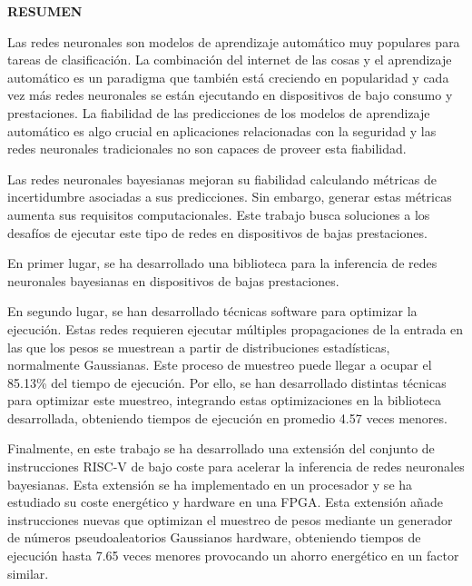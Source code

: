 \begin{center}

\vspace{1cm}
{\Large \bfseries RESUMEN}

\vspace{2cm}
\end{center}

Las redes neuronales son modelos de aprendizaje automático muy populares para tareas de clasificación. La combinación del internet de las cosas y el aprendizaje automático es un paradigma que también está creciendo en popularidad y cada vez más redes neuronales se están ejecutando en dispositivos de bajo consumo y prestaciones. La fiabilidad de las predicciones de los modelos de aprendizaje automático es algo crucial en aplicaciones relacionadas con la seguridad y las redes neuronales tradicionales no son capaces de proveer esta fiabilidad.

Las redes neuronales bayesianas mejoran su fiabilidad calculando métricas de incertidumbre asociadas a sus predicciones. Sin embargo, generar estas métricas aumenta sus requisitos computacionales. Este trabajo busca soluciones a los desafíos de ejecutar este tipo de redes en dispositivos de bajas prestaciones.

En primer lugar, se ha desarrollado una biblioteca para la inferencia de redes neuronales bayesianas en dispositivos de bajas prestaciones.

En segundo lugar, se han desarrollado técnicas software para optimizar la ejecución. Estas redes requieren ejecutar múltiples propagaciones de la entrada en las que los pesos se muestrean a partir de distribuciones estadísticas, normalmente Gaussianas. Este proceso de muestreo puede llegar a ocupar el 85.13\% del tiempo de ejecución. Por ello, se han desarrollado distintas técnicas para optimizar este muestreo, integrando estas optimizaciones en la biblioteca desarrollada, obteniendo tiempos de ejecución en promedio 4.57 veces menores.

Finalmente, en este trabajo se ha desarrollado una extensión del conjunto de instrucciones RISC-V de bajo coste para acelerar la inferencia de redes neuronales bayesianas. Esta extensión se ha implementado en un procesador y se ha estudiado su coste energético y hardware en una FPGA. Esta extensión añade instrucciones nuevas que optimizan el muestreo de pesos mediante un generador de números pseudoaleatorios Gaussianos hardware, obteniendo tiempos de ejecución hasta 7.65 veces menores provocando un ahorro energético en un factor similar.
